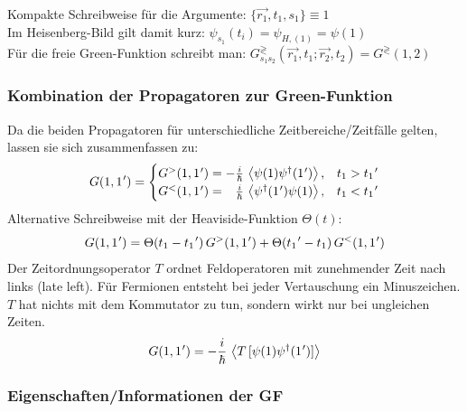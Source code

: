 Kompakte Schreibweise für die Argumente: $\bigl\{\vec{r_1},t_1,s_1\bigr\} \equiv 1$\\ Im Heisenberg-Bild gilt damit
kurz: $\psi_{s_1}(t_i) = \psi_{H,(1)}=\psi(1)$\\ Für die freie Green-Funktion schreibt man:
$G^\gtrless_{s_1s_2}(\vec{r_1},t_1;\vec{r_2},t_2) = G^\gtrless (1,2)$

\subsubsection*{Kombination der Propagatoren zur Green-Funktion}

Da die beiden Propagatoren für unterschiedliche Zeitbereiche/Zeitfälle gelten, lassen sie sich zusammenfassen zu:
\begin{equation}
  G(1,1\mkern1mu') =
  \begin{cases}
    G^{>}(1,1\mkern1mu') = -\frac{i}{\hbar}\,\left\langle\psi(1)\psi^\dagger(1\mkern1mu')\right\rangle,           & t_1 > t_1\mkern1mu' \\
    G^{<}(1,1\mkern1mu') = \phantom{-}\frac{i}{\hbar}\,\left\langle\psi^\dagger(1\mkern1mu')\psi(1)\right\rangle, & t_1 < t_1\mkern1mu'
  \end{cases}
\end{equation}
Alternative Schreibweise mit der Heaviside-Funktion \(\Theta(t)\):
\begin{equation}
  G(1,1\mkern1mu') = \Theta(t_1-t_1\mkern1mu')\,G^{>}(1,1\mkern1mu') + \Theta(t_1\mkern1mu'-t_1)\,G^{<}(1,1\mkern1mu')
\end{equation}
Der Zeitordnungsoperator \(T\) ordnet Feldoperatoren mit zunehmender Zeit nach links (late left). Für Fermionen entsteht bei jeder Vertauschung ein Minuszeichen. \(T\) hat nichts mit dem Kommutator zu tun, sondern wirkt nur bei ungleichen Zeiten.
\begin{equation}
  G(1,1\mkern1mu') = -\frac{i}{\hbar}\,\left\langle T\,[\psi(1)\psi^\dagger(1\mkern1mu')]\right\rangle
\end{equation}

\subsubsection*{Eigenschaften/Informationen der GF}

